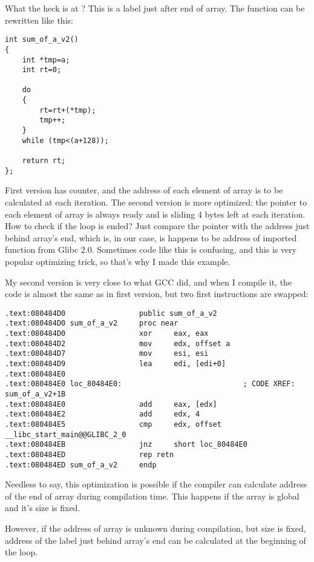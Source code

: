 What the heck is  at ?
This is a label just after end of  array.
The function can be rewritten like this:

\begin{lstlisting}
int sum_of_a_v2()
{
	int *tmp=a;
	int rt=0;
	
	do
	{
		rt=rt+(*tmp);
		tmp++;
	}
	while (tmp<(a+128));

	return rt;
};
\end{lstlisting}

First version has  counter, and the address of each element of array is to be calculated at each iteration.
The second version is more optimized: the pointer to each element of array is always ready and is sliding 4 bytes left at each iteration.
How to check if the loop is ended?
Just compare the pointer with the address just behind array's end, which is, in our case, is happens to be address of imported  function from Glibc 2.0.
Sometimes code like this is confusing, and this is very popular optimizing trick, so that's why I made this example.

My second version is very close to what GCC did, and when I compile it, the code is almost the same as in first version, but two first instructions are swapped:

\begin{lstlisting}
.text:080484D0                 public sum_of_a_v2
.text:080484D0 sum_of_a_v2     proc near
.text:080484D0                 xor     eax, eax
.text:080484D2                 mov     edx, offset a
.text:080484D7                 mov     esi, esi
.text:080484D9                 lea     edi, [edi+0]
.text:080484E0
.text:080484E0 loc_80484E0:                            ; CODE XREF: sum_of_a_v2+1B
.text:080484E0                 add     eax, [edx]
.text:080484E2                 add     edx, 4
.text:080484E5                 cmp     edx, offset __libc_start_main@@GLIBC_2_0
.text:080484EB                 jnz     short loc_80484E0
.text:080484ED                 rep retn
.text:080484ED sum_of_a_v2     endp
\end{lstlisting}

Needless to say, this optimization is possible if the compiler can calculate address of the end of array during compilation time.
This happens if the array is global and it's size is fixed.

However, if the address of array is unknown during compilation, but size is fixed, address of the label just behind array's end can be calculated at the beginning of the loop.

